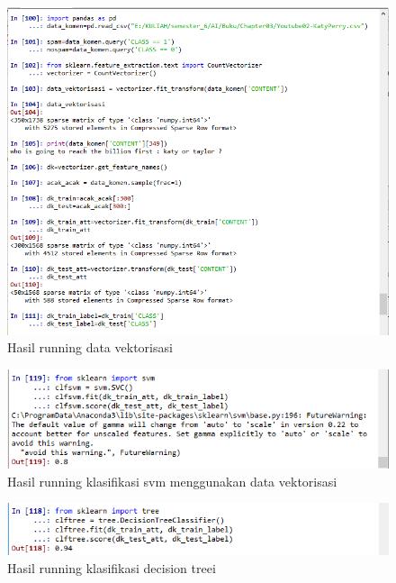 \begin{figure}
      \centerline{\includegraphics[width=1\textwidth]
      {figures/cokro/c62}}
      \caption{Hasil running data vektorisasi}
      \label{c62}
      \end{figure}

\begin{figure}
      \centerline{\includegraphics[width=1\textwidth]
      {figures/cokro/c63}}
      \caption{Hasil running klasifikasi svm menggunakan data vektorisasi}
      \label{c63}
      \end{figure}

\begin{figure}
      \centerline{\includegraphics[width=1\textwidth]
      {figures/cokro/c64}}
      \caption{Hasil running klasifikasi decision treei}
      \label{c64}
      \end{figure}

